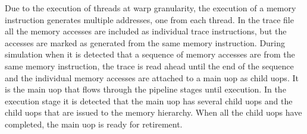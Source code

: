 Due to the execution of threads at warp granularity, the execution of a memory
instruction generates multiple addresses, one from each thread. In the trace
file all the memory accesses are included as individual trace instructions, but
the accesses are marked as generated from the same memory instruction. During
simulation when it is detected that a sequence of memory accesses are from the
same memory instruction, the trace is read ahead until the end of the sequence
and the individual memory accesses are attached to a main uop as child uops. It
is the main uop that flows through the pipeline stages until execution. In the
execution stage it is detected that the main uop has several child uops and the
child uops that are issued to the memory hierarchy. When all the child uops
have completed, the main uop is ready for retirement.



